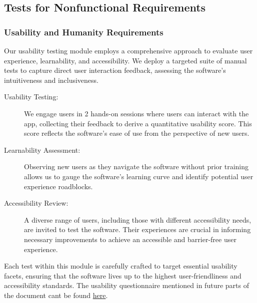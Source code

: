 \documentclass[12pt, titlepage]{article}
\begin{document}
\subsection{Tests for Nonfunctional Requirements}
\label{Section 4.2}


\subsubsection{Usability and Humanity Requirements}

Our usability testing module employs a comprehensive approach to evaluate user experience, learnability, and accessibility. We deploy a targeted suite of manual tests to capture direct user interaction feedback, assessing the software's intuitiveness and inclusiveness.

\begin{description}
    \item[Usability Testing:] We engage users in 2 hands-on sessions where users can interact with the app, collecting their feedback to derive a quantitative usability score. This score reflects the software’s ease of use from the perspective of new users.
    \item[Learnability Assessment:] Observing new users as they navigate the software without prior training allows us to gauge the software's learning curve and identify potential user experience roadblocks.
    \item[Accessibility Review:] A diverse range of users, including those with different accessibility needs, are invited to test the software. Their experiences are crucial in informing necessary improvements to achieve an accessible and barrier-free user experience.
\end{description}

Each test within this module is carefully crafted to target essential usability facets, ensuring that the software lives up to the highest user-friendliness and accessibility standards. The usability questionnaire mentioned in future parts of the document cant be found \href{https://docs.google.com/forms/d/e/1FAIpQLSeHQbMiXtfpNlbR3EWfvaZtoYHO0kur1HRKV1nBb5CGQUYkUQ/viewform}{here}.
\end{document}
